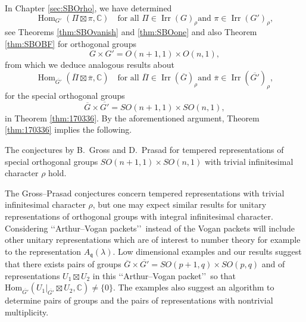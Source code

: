 \medskip

In Chapter \ref{sec:SBOrho}, 
 we have determined
\[
   {\operatorname{Hom}}_{G'}(\Pi \boxtimes \pi, {\mathbb{C}})
\quad
\text{for all $\Pi \in {\operatorname{Irr}}(G)_{\rho}$
 and $\pi \in {\operatorname{Irr}}(G')_{\rho}$}, 
\]
see Theorems \ref{thm:SBOvanish} and \ref{thm:SBOone}
 and also Theorem \ref{thm:SBOBF}
 for orthogonal groups
\[
   G \times G'=O(n+1,1) \times O(n,1), 
\]
{}from which we deduce analogous results about
\[
   {\operatorname{Hom}}_{\overline{G'}}(\overline \Pi \boxtimes \overline \pi, {\mathbb{C}})
\quad
\text{for all $\overline\Pi \in {\operatorname{Irr}}(\overline G)_{\rho}$
 and $\overline \pi \in {\operatorname{Irr}}(\overline{G'})_{\rho}$},
\]
for the special orthogonal groups
\[
   \overline G \times \overline{G'} = SO(n+1,1) \times SO(n,1), 
\]
in Theorem \ref{thm:170336}.  
By the aforementioned argument,
 Theorem \ref{thm:170336} implies the following.  

\begin{theorem}
\label{thm:GPdisctemp}
The conjectures by B.~Gross and D.~Prasad \cite{GP}
 for tempered representations
 of special orthogonal groups $SO(n+1,1) \times SO(n,1)$ with trivial infinitesimal character $\rho$ hold.  
\end{theorem}

\begin{remark}
The Gross--Prasad conjectures concern tempered representations
 with trivial infinitesimal character $\rho$, 
 but one may expect similar results for unitary representations
 of orthogonal groups with integral infinitesimal character. 
Considering \lq\lq{Arthur--Vogan packets}\rq\rq\
 instead of the Vogan packets will include 
 other unitary representations
 which are of interest to number theory
 for example to the representation 
$A_{\mathfrak{q}}(\lambda)$.  
Low dimensional examples  and our results suggest
 that there exists  pairs of groups
 $\overline G\times \overline{G'}=SO(p+1,q) \times SO(p,q)$
 and of representations $ U_1 \boxtimes U_2$
 in this \lq\lq{Arthur--Vogan packet}\rq\rq\ 
 so that 
$
   \mbox{Hom}_{\overline{G'}}(U_1|_{\overline{G'}} \boxtimes U_2, \mathbb{C}) \not = \{0\}. 
$
The examples also suggest an algorithm
 to determine  pairs of groups
 and the pairs of representations with nontrivial multiplicity.
\end{remark}

